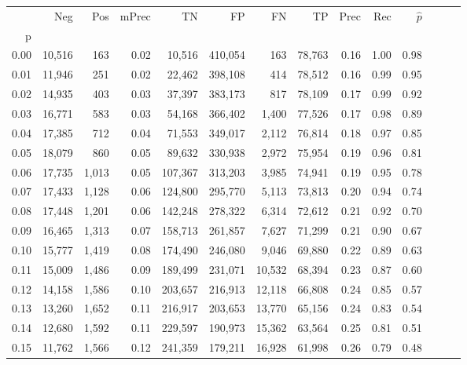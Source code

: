 \begin{tabular}{rrrrrrrrrrrrrr}
\toprule
{} &     Neg &    Pos & mPrec &       TN &       FP &      FN &      TP &  Prec &   Rec & $\hat{p}$ \\
p    &         &        &       &          &          &         &         &       &       &           \\
\midrule
0.00 &  10,516 &    163 &  0.02 &   10,516 &  410,054 &     163 &  78,763 &  0.16 &  1.00 &      0.98 \\
0.01 &  11,946 &    251 &  0.02 &   22,462 &  398,108 &     414 &  78,512 &  0.16 &  0.99 &      0.95 \\
0.02 &  14,935 &    403 &  0.03 &   37,397 &  383,173 &     817 &  78,109 &  0.17 &  0.99 &      0.92 \\
0.03 &  16,771 &    583 &  0.03 &   54,168 &  366,402 &   1,400 &  77,526 &  0.17 &  0.98 &      0.89 \\
0.04 &  17,385 &    712 &  0.04 &   71,553 &  349,017 &   2,112 &  76,814 &  0.18 &  0.97 &      0.85 \\
0.05 &  18,079 &    860 &  0.05 &   89,632 &  330,938 &   2,972 &  75,954 &  0.19 &  0.96 &      0.81 \\
0.06 &  17,735 &  1,013 &  0.05 &  107,367 &  313,203 &   3,985 &  74,941 &  0.19 &  0.95 &      0.78 \\
0.07 &  17,433 &  1,128 &  0.06 &  124,800 &  295,770 &   5,113 &  73,813 &  0.20 &  0.94 &      0.74 \\
0.08 &  17,448 &  1,201 &  0.06 &  142,248 &  278,322 &   6,314 &  72,612 &  0.21 &  0.92 &      0.70 \\
0.09 &  16,465 &  1,313 &  0.07 &  158,713 &  261,857 &   7,627 &  71,299 &  0.21 &  0.90 &      0.67 \\
0.10 &  15,777 &  1,419 &  0.08 &  174,490 &  246,080 &   9,046 &  69,880 &  0.22 &  0.89 &      0.63 \\
0.11 &  15,009 &  1,486 &  0.09 &  189,499 &  231,071 &  10,532 &  68,394 &  0.23 &  0.87 &      0.60 \\
0.12 &  14,158 &  1,586 &  0.10 &  203,657 &  216,913 &  12,118 &  66,808 &  0.24 &  0.85 &      0.57 \\
0.13 &  13,260 &  1,652 &  0.11 &  216,917 &  203,653 &  13,770 &  65,156 &  0.24 &  0.83 &      0.54 \\
0.14 &  12,680 &  1,592 &  0.11 &  229,597 &  190,973 &  15,362 &  63,564 &  0.25 &  0.81 &      0.51 \\
0.15 &  11,762 &  1,566 &  0.12 &  241,359 &  179,211 &  16,928 &  61,998 &  0.26 &  0.79 &      0.48 \\

\end{tabular}
